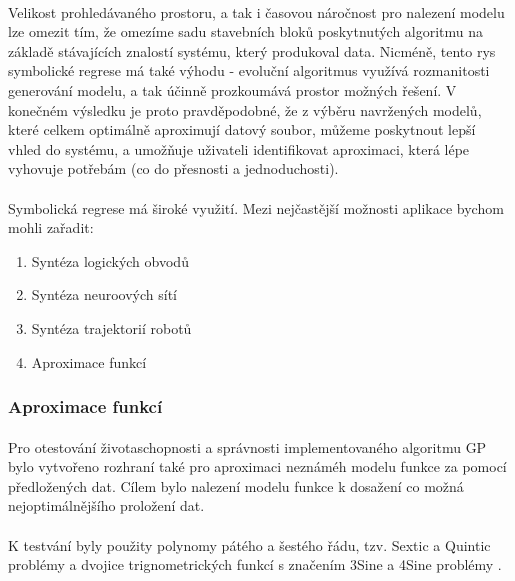 \documentclass[bc,male,java,dept460]{diploma}		%
\begin{document}

\paragraph*{}
Velikost prohledávaného prostoru, a tak i časovou náročnost pro nalezení modelu lze omezit tím, že omezíme sadu stavebních bloků poskytnutých algoritmu na základě stávajících znalostí systému, který produkoval data. Nicméně, tento rys symbolické regrese má také výhodu - evoluční algoritmus využívá rozmanitosti generování modelu, a tak účinně prozkoumává prostor možných řešení. V konečném výsledku je proto pravděpodobné, že z výběru navržených modelů, které celkem optimálně aproximují datový soubor, můžeme poskytnout lepší vhled do systému, a umožňuje uživateli identifikovat aproximaci, která lépe vyhovuje potřebám (co do přesnosti a jednoduchosti).

\paragraph*{}
Symbolická regrese má široké využití. Mezi nejčastější možnosti aplikace bychom mohli zařadit:
\begin{enumerate}
\item Syntéza logických obvodů
\item Syntéza neuroových sítí
\item Syntéza trajektorií robotů
\item Aproximace funkcí
\end{enumerate}

\subsubsection{Aproximace funkcí}
\paragraph*{}
Pro otestování životaschopnosti a správnosti implementovaného algoritmu GP bylo vytvořeno rozhraní také pro aproximaci neznáméh modelu funkce za pomocí předložených dat. Cílem bylo nalezení modelu funkce k dosažení co možná nejoptimálnějšího proložení dat.

\paragraph*{}
K testvání byly použity polynomy pátého a šestého řádu, tzv. Sextic a Quintic problémy a dvojice trignometrických funkcí s značením 3Sine a 4Sine problémy \cite{evolvyptech}.
\end{document}
